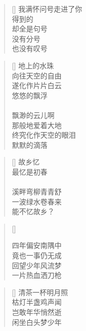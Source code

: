 \renewcommand{\poemtoc}{section}
\settowidth{\versewidth}{我满怀问号走进了你}
\begin{verse}[\versewidth]
我满怀问号走进了你\\
得到的\\
却全是句号\\
没有分号\\
也没有叹号\\
\end{verse}


\renewcommand{\poemtoc}{section}
\settowidth{\versewidth}{秋高气爽 QA射雕}
\begin{verse}[\versewidth]
地上的水珠\\
向往天空的自由\\
遂化作片片白云\\
悠悠的飘浮\\
~\\
飘渺的云儿啊\\
那般地爱着大地\\
终究化作天空的眼泪\\
默默的滴落
\end{verse}

\renewcommand{\poemtoc}{section}
\settowidth{\versewidth}{溪畔弯柳青青舒}
\begin{verse}[\versewidth]
故乡忆\\
最忆是初春\\
~\\
溪畔弯柳青青舒\\
一波绿水卷春来\\
能不忆故乡？
\end{verse}

\renewcommand{\poemtoc}{section}
\settowidth{\versewidth}{四年偏安南隅中}
\begin{verse}[\versewidth]

四年偏安南隅中\\
竟也一事仍无成\\
回望少年风流梦\\
一片热血洒刀枪
\end{verse}

\renewcommand{\poemtoc}{section}
\settowidth{\versewidth}{四年偏安南隅中}
\begin{verse}[\versewidth]
清茶一杯明月照\\
枯灯半盏鸡声闻\\
岂敢年华悄然逝\\
闲坐白头梦少年\\
\end{verse}

